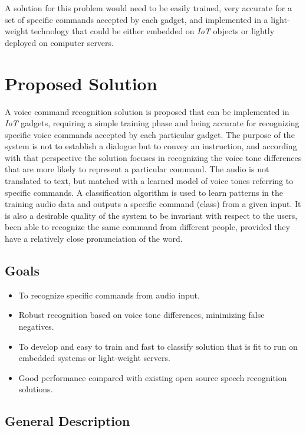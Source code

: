 \documentclass[anon]{CI}
\begin{document}
A solution for this problem would need to be easily trained, very accurate for a set of specific commands accepted by each gadget, and implemented in a light-weight technology that could be either embedded on \emph{IoT} objects or lightly deployed on computer servers.


\section{Proposed Solution}

A voice command recognition solution is proposed that can be implemented in \emph{IoT} gadgets, requiring a simple training phase and being accurate for recognizing specific voice commands accepted by each particular gadget. The purpose of the system is not to establish a dialogue but to convey an instruction, and according with that perspective the solution focuses in recognizing the voice tone differences that are more likely to represent a particular command. The audio is not translated to text, but matched with a learned model of voice tones referring to specific commands. A classification algorithm is used to learn patterns in the training audio data and outputs a specific command (class) from a given input. It is also a desirable quality of the system to be invariant with respect to the users, been able to recognize the same command from different people, provided they have a relatively close pronunciation of the word.

\subsection{Goals}
\begin{itemize}
	\item To recognize specific commands from audio input.
	\item Robust recognition based on voice tone differences, minimizing false negatives.
	\item To develop and easy to train and fast to classify solution that is fit to run on embedded systems or light-weight servers.
	\item Good performance compared with existing open source speech 
recognition solutions.
\end{itemize}

\subsection{General Description}
\end{document}
